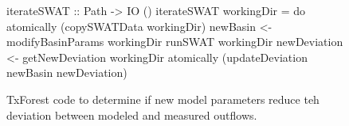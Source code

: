 \begin{figure}
\begin{code}
iterateSWAT :: Path -> IO ()
iterateSWAT workingDir = do
  atomically (copySWATData workingDir)
  newBasin <- modifyBasinParams workingDir
  runSWAT workingDir
  newDeviation <- getNewDeviation workingDir
  atomically (updateDeviation newBasin newDeviation)
\end{code}
\caption{TxForest code to determine if new model parameters reduce teh
deviation between modeled and measured outflows.}
\label{fig:SWAT-opt-code}
\end{figure}



